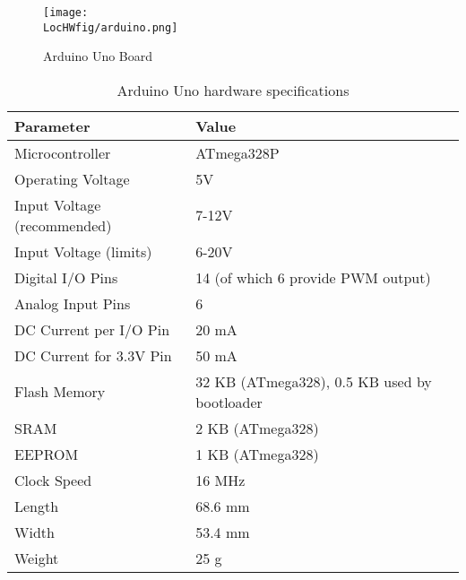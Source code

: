 \begin{figure}
  \centering
  \texttt{[image: \\LocHWfig/arduino.png]}
  \caption{Arduino Uno Board}
  \label{arduino}
\end{figure}

\begin{table}
  \begin{center}
    \begin{tabular}{lp{4cm}}
      \hline
      Parameter                   & Value                                        \\ \hline
      Microcontroller             & ATmega328P                                   \\
      Operating Voltage           & 5V                                           \\
      Input Voltage (recommended) & 7-12V                                        \\
      Input Voltage (limits)      & 6-20V                                        \\
      Digital I/O Pins            & 14 (of which 6 provide PWM output)           \\
      Analog Input Pins           & 6                                            \\
      DC Current per I/O Pin      & 20 mA                                        \\
      DC Current for 3.3V Pin     & 50 mA                                        \\
      Flash Memory                & 32 KB (ATmega328), 0.5 KB used by bootloader \\
      SRAM                        & 2 KB (ATmega328)                             \\
      EEPROM                      & 1 KB (ATmega328)                             \\
      Clock Speed                 & 16 MHz                                       \\
      Length                      & 68.6 mm                                      \\
      Width                       & 53.4 mm                                      \\
      Weight                      & 25 g                                         \\
      \hline
    \end{tabular}
    \caption{Arduino Uno hardware specifications}
    \label{micro-table}
  \end{center}
\end{table}

